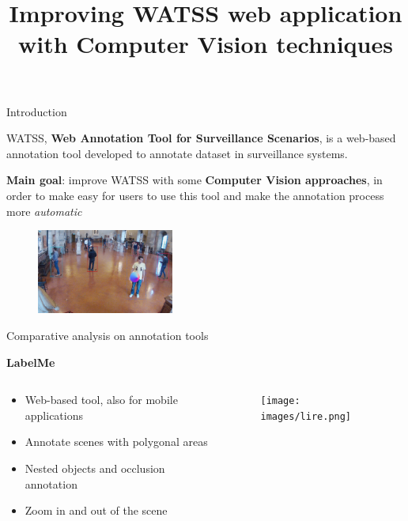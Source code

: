 \documentclass{beamer}
\author{}
\title{\huge Improving WATSS web application with Computer Vision techniques}
\date{}
\begin{document}
\titlepageframe

\begin{tframe}{Introduction}

WATSS, \textbf{Web Annotation Tool for Surveillance Scenarios}, is a web-based annotation tool developed to annotate dataset in surveillance systems.

\vspace{0.3cm}

\textbf{Main goal}: improve WATSS with some \textbf{Computer Vision approaches}, in order to make easy for users to use this tool and make the annotation process more \emph{automatic}

\begin{figure}[h]
\begin{center}
\includegraphics[width=0.4\textwidth]{images/frame.jpg}
\end{center}
\label{fig:mainframe}
\end{figure}

\end{tframe}

\begin{tframe}{Comparative analysis on annotation tools}

\textbf{LabelMe}

\begin{columns}[t]
\begin{column}{0.35\textwidth}
\vspace{0.5cm}
\begin{itemize}
\item Web-based tool, also for mobile applications
\item Annotate scenes with polygonal areas
\item Nested objects and occlusion annotation
\item Zoom in and out of the scene
\end{itemize}
\end{column}
\begin{column}{0.4\textwidth}
\begin{figure}[h]
\centering
\texttt{[image: images/lire.png]}
\end{figure}
\end{column}
\end{columns}



\end{tframe}
\end{document}
